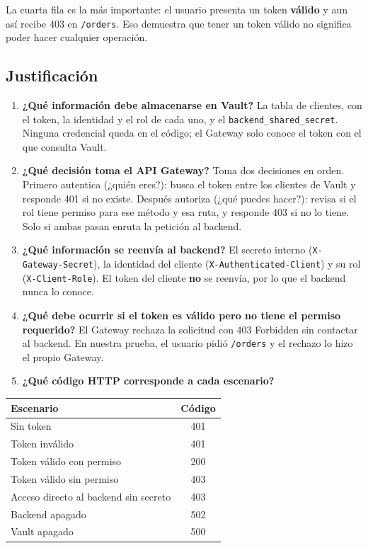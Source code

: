 \documentclass[11pt,a4paper]{article}
\begin{document}
La cuarta fila es la más importante: el usuario presenta un token \textbf{válido} y aun así recibe 403 en \texttt{/orders}. Eso demuestra que tener un token válido no significa poder hacer cualquier operación.

\subsection{Justificación}

\begin{enumerate}
  \item \textbf{¿Qué información debe almacenarse en Vault?} La tabla de clientes, con el token, la identidad y el rol de cada uno, y el \texttt{backend\_shared\_secret}. Ninguna credencial queda en el código; el Gateway solo conoce el token con el que consulta Vault.

  \item \textbf{¿Qué decisión toma el API Gateway?} Toma dos decisiones en orden. Primero autentica (¿quién eres?): busca el token entre los clientes de Vault y responde 401 si no existe. Después autoriza (¿qué puedes hacer?): revisa si el rol tiene permiso para ese método y esa ruta, y responde 403 si no lo tiene. Solo si ambas pasan enruta la petición al backend.

  \item \textbf{¿Qué información se reenvía al backend?} El secreto interno (\texttt{X-Gateway-Secret}), la identidad del cliente (\texttt{X-Authenticated-Client}) y su rol (\texttt{X-Client-Role}). El token del cliente \textbf{no} se reenvía, por lo que el backend nunca lo conoce.

  \item \textbf{¿Qué debe ocurrir si el token es válido pero no tiene el permiso requerido?} El Gateway rechaza la solicitud con 403 Forbidden sin contactar al backend. En nuestra prueba, el usuario pidió \texttt{/orders} y el rechazo lo hizo el propio Gateway.

  \item \textbf{¿Qué código HTTP corresponde a cada escenario?}
\end{enumerate}

\begin{table}[h]
\centering
\begin{tabular}{@{}lc@{}}
\toprule
\textbf{Escenario} & \textbf{Código} \\
\midrule
Sin token & 401 \\
Token inválido & 401 \\
Token válido con permiso & 200 \\
Token válido sin permiso & 403 \\
Acceso directo al backend sin secreto & 403 \\
Backend apagado & 502 \\
Vault apagado & 500 \\
\bottomrule
\end{tabular}
\end{table}
\end{document}
